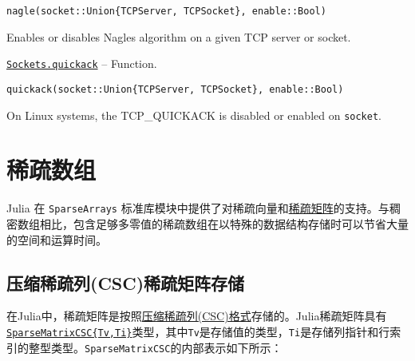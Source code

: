 \begin{adjustwidth}{2em}{0pt}


\begin{verbatim}
nagle(socket::Union{TCPServer, TCPSocket}, enable::Bool)
\end{verbatim}

Enables or disables Nagle{\textquotesingle}s algorithm on a given TCP server or socket.



\end{adjustwidth}
\hypertarget{14774922472341203206}{} 
\hyperlink{14774922472341203206}{\texttt{Sockets.quickack}}  -- {Function.}

\begin{adjustwidth}{2em}{0pt}


\begin{verbatim}
quickack(socket::Union{TCPServer, TCPSocket}, enable::Bool)
\end{verbatim}

On Linux systems, the TCP\_QUICKACK is disabled or enabled on \texttt{socket}.



\end{adjustwidth}

\hypertarget{13048400462292431190}{}


\chapter{稀疏数组}





Julia 在 \texttt{SparseArrays} 标准库模块中提供了对稀疏向量和\href{https://en.wikipedia.org/wiki/Sparse\_matrix}{稀疏矩阵}的支持。与稠密数组相比，包含足够多零值的稀疏数组在以特殊的数据结构存储时可以节省大量的空间和运算时间。



\hypertarget{4438718230137239554}{}


\section{压缩稀疏列(CSC)稀疏矩阵存储}



在Julia中，稀疏矩阵是按照\href{https://en.wikipedia.org/wiki/Sparse\_matrix\#Compressed\_sparse\_column\_.28CSC\_or\_CCS.29}{压缩稀疏列(CSC)格式}存储的。Julia稀疏矩阵具有\hyperlink{15099699527958384292}{\texttt{SparseMatrixCSC\{Tv,Ti\}}}类型，其中\texttt{Tv}是存储值的类型，\texttt{Ti}是存储列指针和行索引的整型类型。\texttt{SparseMatrixCSC}的内部表示如下所示：




